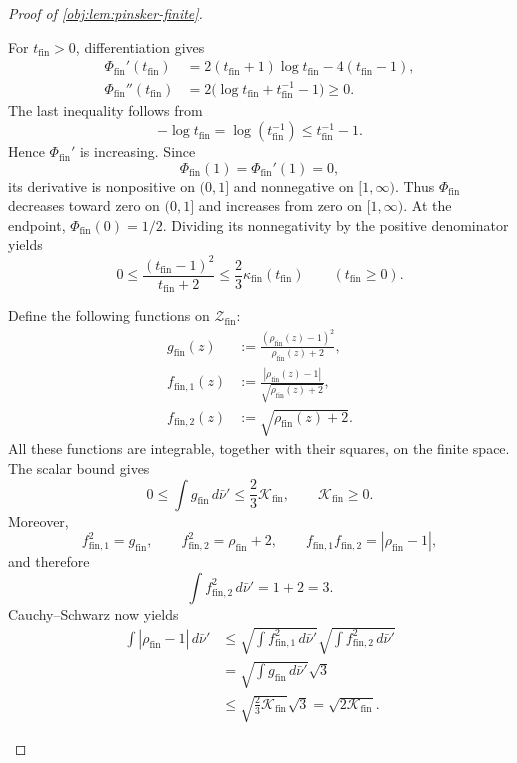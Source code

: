 \begin{proof}[Proof of \cref{obj:lem:pinsker-finite}]
\begin{enumerate}
For \(t_{\mathrm{fin}}>0\), differentiation gives
\[
\begin{aligned}
\Phi_{\mathrm{fin}}'(t_{\mathrm{fin}})
&=2(t_{\mathrm{fin}}+1)\log t_{\mathrm{fin}}
  -4(t_{\mathrm{fin}}-1),\\
\Phi_{\mathrm{fin}}''(t_{\mathrm{fin}})
&=2\bigl(\log t_{\mathrm{fin}}+t_{\mathrm{fin}}^{-1}-1\bigr)
\ge0.
\end{aligned}
\]
The last inequality follows from
\[
-\log t_{\mathrm{fin}}
=\log(t_{\mathrm{fin}}^{-1})
\le t_{\mathrm{fin}}^{-1}-1.
\]
Hence \(\Phi_{\mathrm{fin}}'\) is increasing. Since
\[
\Phi_{\mathrm{fin}}(1)=\Phi_{\mathrm{fin}}'(1)=0,
\]
its derivative is nonpositive on \((0,1]\) and nonnegative on
\([1,\infty)\). Thus \(\Phi_{\mathrm{fin}}\) decreases toward zero on
\((0,1]\) and increases from zero on \([1,\infty)\). At the endpoint,
\(\Phi_{\mathrm{fin}}(0)=1/2\). Dividing its nonnegativity by the positive denominator yields
\[
0\le
\frac{(t_{\mathrm{fin}}-1)^2}{t_{\mathrm{fin}}+2}
\le\frac23\kappa_{\mathrm{fin}}(t_{\mathrm{fin}})
\qquad(t_{\mathrm{fin}}\ge0).
\]

Define the following functions on \(\mathcal Z_{\mathrm{fin}}\):
\[
\begin{aligned}
g_{\mathrm{fin}}(z)
&:=\frac{(\rho_{\mathrm{fin}}(z)-1)^2}{\rho_{\mathrm{fin}}(z)+2},\\
f_{\mathrm{fin},1}(z)
&:=\frac{|\rho_{\mathrm{fin}}(z)-1|}
        {\sqrt{\rho_{\mathrm{fin}}(z)+2}},\\
f_{\mathrm{fin},2}(z)
&:=\sqrt{\rho_{\mathrm{fin}}(z)+2}.
\end{aligned}
\]
All these functions are integrable, together with their squares, on the finite space. The scalar bound gives
\[
0\le\int g_{\mathrm{fin}}\,d\bar\nu'
\le\frac23\mathcal K_{\mathrm{fin}},
\qquad
\mathcal K_{\mathrm{fin}}\ge0.
\]
Moreover,
\[
f_{\mathrm{fin},1}^2=g_{\mathrm{fin}},
\qquad
f_{\mathrm{fin},2}^2=\rho_{\mathrm{fin}}+2,
\qquad
f_{\mathrm{fin},1}f_{\mathrm{fin},2}
=|\rho_{\mathrm{fin}}-1|,
\]
and therefore
\[
\int f_{\mathrm{fin},2}^2\,d\bar\nu'=1+2=3.
\]
Cauchy--Schwarz now yields
\[
\begin{aligned}
\int|\rho_{\mathrm{fin}}-1|\,d\bar\nu'
&\le
\sqrt{\int f_{\mathrm{fin},1}^2\,d\bar\nu'}
\sqrt{\int f_{\mathrm{fin},2}^2\,d\bar\nu'}\\
&=\sqrt{\int g_{\mathrm{fin}}\,d\bar\nu'}\sqrt3\\
&\le\sqrt{\frac23\mathcal K_{\mathrm{fin}}}\sqrt3
=\sqrt{2\mathcal K_{\mathrm{fin}}}.
\end{aligned}
\]


\end{enumerate}
\end{proof}
